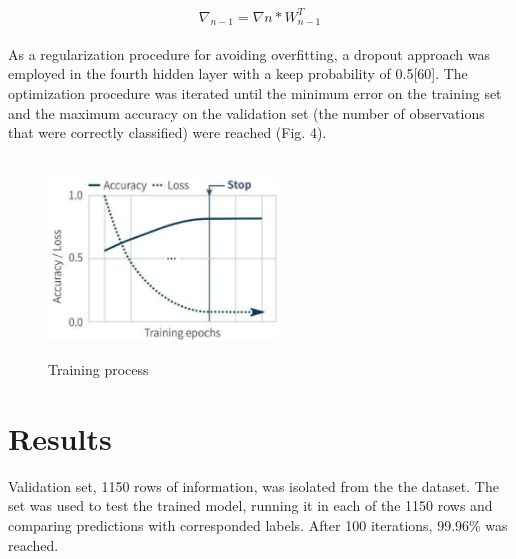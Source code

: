 \documentclass{llncs}       %
\begin{document}
\begin{equation} 
\nabla_{n-1}=\nabla{n}*W^{T}_{n-1}
\end{equation}

\paragraph{}
\paragraph{}
As a regularization procedure for avoiding overfitting, a dropout approach was employed in the fourth hidden layer with a keep probability of 0.5[60]. The optimization procedure was iterated until the minimum error on the training set and the maximum accuracy on the validation set (the number of observations that were correctly classified) were reached (Fig. 4). 
\paragraph{}

\begin{figure}[h]
\centering
\includegraphics[width=6.08cm,height=5.11cm]{media/training-pro.eps}
\caption{ Training process}
\end{figure}

\paragraph{}
\section{Results}
\label{sec:4}
Validation set, 1150 rows of information, was isolated from the the dataset.   The set was used to test the trained model, running it in each of the 1150 rows and comparing predictions with corresponded labels.  After 100 iterations, 99.96\% was reached.
\paragraph{}
\end{document}
